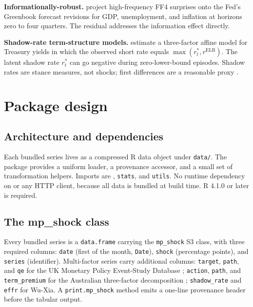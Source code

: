 \textbf{Informationally-robust.} \citet{miranda2021transmission} project high-frequency FF4 surprises onto the Fed's Greenbook forecast revisions for GDP, unemployment, and inflation at horizons zero to four quarters. The residual addresses the information effect directly.

\textbf{Shadow-rate term-structure models.} \citet{wu2016measuring} estimate a three-factor affine model for Treasury yields in which the observed short rate equals \(\max(r^*_t, r^{\mathrm{ELB}})\). The latent shadow rate \(r^*_t\) can go negative during zero-lower-bound episodes. Shadow rates are stance measures, not shocks; first differences are a reasonable proxy \citep{krippner2020comparison}.

\section{Package design}\label{package-design}

\subsection{Architecture and dependencies}\label{architecture-and-dependencies}

Each bundled series lives as a compressed R data object under \texttt{data/}. The package provides a uniform loader, a provenance accessor, and a small set of transformation helpers. Imports are , \texttt{stats}, and \texttt{utils}. No runtime dependency on  or any HTTP client, because all data is bundled at build time. R 4.1.0 or later is required.

\subsection{The mp\_shock class}\label{the-mp_shock-class}

Every bundled series is a \texttt{data.frame} carrying the \texttt{mp\_shock} S3 class, with three required columns: \texttt{date} (first of the month, \texttt{Date}), \texttt{shock} (percentage points), and \texttt{series} (identifier). Multi-factor series carry additional columns: \texttt{target}, \texttt{path}, and \texttt{qe} for the UK Monetary Policy Event-Study Database \citep{braun2025measuring}; \texttt{action}, \texttt{path}, and \texttt{term\_premium} for the Australian three-factor decomposition \citep{hambur2023monetary}; \texttt{shadow\_rate} and \texttt{effr} for Wu-Xia. A \texttt{print.mp\_shock} method emits a one-line provenance header before the tabular output.

